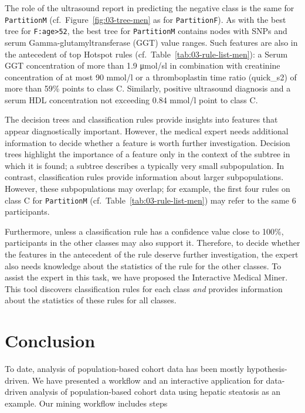 \documentclass[
  oneside]{book}
\begin{document}
The role of the ultrasound report in predicting the negative class is the same for \texttt{PartitionM} (cf.~Figure~\ref{fig:03-tree-men} as for \texttt{PartitionF}).
As with the best tree for \texttt{F:age\textgreater{}52}, the best tree for \texttt{PartitionM} contains nodes with SNPs and serum Gamma-glutamyltransferase (GGT) value ranges.
Such features are also in the antecedent of top Hotspot rules (cf.~Table~\ref{tab:03-rule-list-men}): a Serum GGT concentration of more than 1.9 μmol/sl in combination with creatinine concentration of at most 90 mmol/l or a thromboplastin time ratio (quick\_s2) of more than 59\% points to class C.
Similarly, positive ultrasound diagnosis and a serum HDL concentration not exceeding 0.84 mmol/l point to class C.

The decision trees and classification rules provide insights into features that appear diagnostically important.
However, the medical expert needs additional information to decide whether a feature is worth further investigation.
Decision trees highlight the importance of a feature only in the context of the subtree in which it is found; a subtree describes a typically very small subpopulation.
In contrast, classification rules provide information about larger subpopulations.
However, these subpopulations may overlap; for example, the first four rules on class C for \texttt{PartitionM} (cf.~Table~\ref{tab:03-rule-list-men}) may refer to the same 6 participants.

Furthermore, unless a classification rule has a confidence value close to 100\%, participants in the other classes may also support it.
Therefore, to decide whether the features in the antecedent of the rule deserve further investigation, the expert also needs knowledge about the statistics of the rule for the other classes.
To assist the expert in this task, we have proposed the Interactive Medical Miner.
This tool discovers classification rules for each class \emph{and} provides information about the statistics of these rules for all classes.

\hypertarget{imm-conclusion}{%
\section{Conclusion}\label{imm-conclusion}}

To date, analysis of population-based cohort data has been mostly hypothesis-driven.
We have presented a workflow and an interactive application for data-driven analysis of population-based cohort data using hepatic steatosis as an example.
Our mining workflow includes steps
\end{document}

